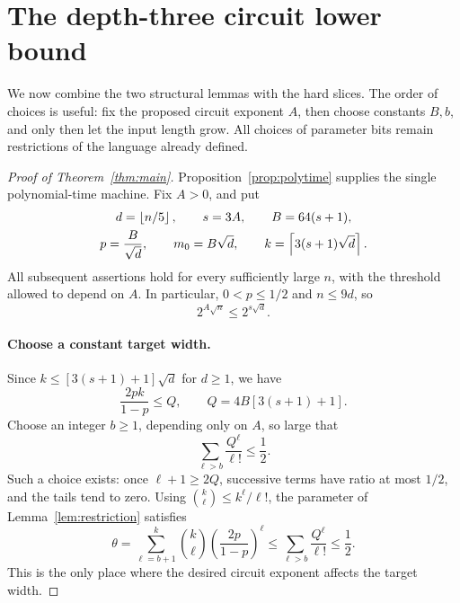 \section{The depth-three circuit lower bound}\label{sec:lower-bound}

We now combine the two structural lemmas with the hard slices.
The order of choices is useful: fix the proposed circuit exponent \(A\),
then choose constants \(B,b\), and only then let the input length grow.
All choices of parameter bits remain restrictions of the language already
defined.

\begin{proof}[Proof of Theorem~\ref{thm:main}]
Proposition~\ref{prop:polytime} supplies the single polynomial-time
machine.  Fix \(A>0\), and put
\[
\begin{gathered}
 d=\left\lfloor n/5\right\rfloor,\qquad s=3A,\qquad B=64(s+1),\\
 p=\frac{B}{\sqrt d},\qquad m_0=B\sqrt d,\qquad
 k=\left\lceil3(s+1)\sqrt d\right\rceil.
\end{gathered}
\]
All subsequent assertions hold for every sufficiently large \(n\),
with the threshold allowed to depend on \(A\).
In particular, \(0<p\le1/2\) and \(n\le9d\), so
\begin{equation}\label{eq:circuit-size-scale}
 2^{A\sqrt n}\le2^{s\sqrt d}.
\end{equation}

\paragraph{Choose a constant target width.}
Since \(k\le[3(s+1)+1]\sqrt d\) for \(d\ge1\), we have
\[
 \frac{2pk}{1-p}\le Q,\qquad
 Q=4B[3(s+1)+1].
\]
Choose an integer \(b\ge1\), depending only on \(A\), so large that
\begin{equation}\label{eq:factorial-tail-choice}
 \sum_{\ell>b}\frac{Q^\ell}{\ell!}\le\frac12.
\end{equation}
Such a choice exists: once \(\ell+1\ge2Q\), successive terms have
ratio at most \(1/2\), and the tails tend to zero.
Using \(\binom{k}{\ell}\le k^\ell/\ell!\), the parameter of
Lemma~\ref{lem:restriction} satisfies
\begin{equation}\label{eq:theta-half}
 \theta=\sum_{\ell=b+1}^k
       \binom{k}{\ell}\left(\frac{2p}{1-p}\right)^\ell
 \le\sum_{\ell>b}\frac{Q^\ell}{\ell!}\le\frac12.
\end{equation}
This is the only place where the desired circuit exponent affects the
target width.


\end{proof}
